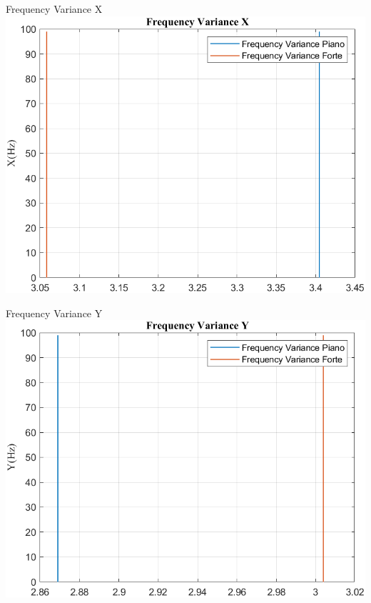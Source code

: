 	\begin{frame}{{Frequency Variance X}}
		\centering\includegraphics[height=.8\textheight]{figure/Vel/Trasformata/Frequency VarianceX}
	\end{frame}
	
	\begin{frame}{{Frequency Variance Y}}
		\centering\includegraphics[height=.8\textheight]{figure/Vel/Trasformata/Frequency VarianceY}
	\end{frame}
	
